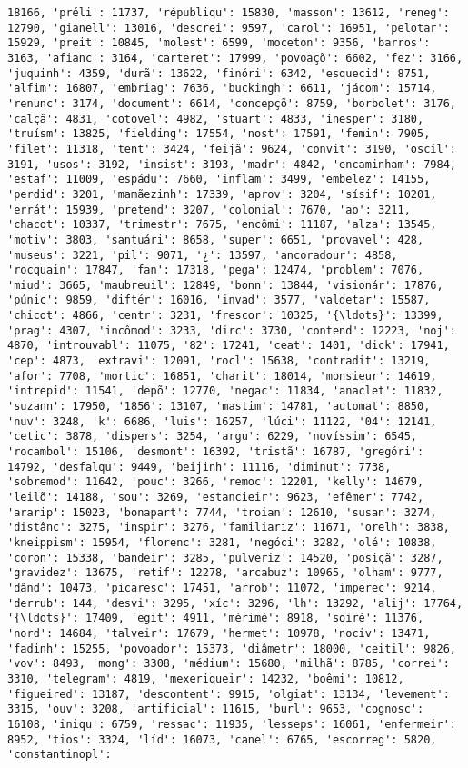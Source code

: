 \begin{Verbatim}[commandchars=\\\{\}]
18166, 'préli': 11737, 'républiqu': 15830, 'masson': 13612, 'reneg': 12790, 'gianell': 13016, 'descrei': 9597, 'carol': 16951, 'pelotar': 15929, 'preit': 10845, 'molest': 6599, 'moceton': 9356, 'barros': 3163, 'afianc': 3164, 'carteret': 17999, 'povoaçõ': 6602, 'fez': 3166, 'juquinh': 4359, 'durã': 13622, 'finóri': 6342, 'esquecid': 8751, 'alfim': 16807, 'embriag': 7636, 'buckingh': 6611, 'jácom': 15714, 'renunc': 3174, 'document': 6614, 'concepçõ': 8759, 'borbolet': 3176, 'calçã': 4831, 'cotovel': 4982, 'stuart': 4833, 'inesper': 3180, 'truísm': 13825, 'fielding': 17554, 'nost': 17591, 'femin': 7905, 'filet': 11318, 'tent': 3424, 'feijã': 9624, 'convit': 3190, 'oscil': 3191, 'usos': 3192, 'insist': 3193, 'madr': 4842, 'encaminham': 7984, 'estaf': 11009, 'espádu': 7660, 'inflam': 3499, 'embelez': 14155, 'perdid': 3201, 'mamãezinh': 17339, 'aprov': 3204, 'sísif': 10201, 'errát': 15939, 'pretend': 3207, 'colonial': 7670, 'ao': 3211, 'chacot': 10337, 'trimestr': 7675, 'encômi': 11187, 'alza': 13545, 'motiv': 3803, 'santuári': 8658, 'super': 6651, 'provavel': 428, 'museus': 3221, 'pil': 9071, '¿': 13597, 'ancoradour': 4858, 'rocquain': 17847, 'fan': 17318, 'pega': 12474, 'problem': 7076, 'miud': 3665, 'maubreuil': 12849, 'bonn': 13844, 'visionár': 17876, 'púnic': 9859, 'diftér': 16016, 'invad': 3577, 'valdetar': 15587, 'chicot': 4866, 'centr': 3231, 'frescor': 10325, '{\ldots}': 13399, 'prag': 4307, 'incômod': 3233, 'dirc': 3730, 'contend': 12223, 'noj': 4870, 'introuvabl': 11075, '82': 17241, 'ceat': 1401, 'dick': 17941, 'cep': 4873, 'extravi': 12091, 'rocl': 15638, 'contradit': 13219, 'afor': 7708, 'mortic': 16851, 'charit': 18014, 'monsieur': 14619, 'intrepid': 11541, 'depõ': 12770, 'negac': 11834, 'anaclet': 11832, 'suzann': 17950, '1856': 13107, 'mastim': 14781, 'automat': 8850, 'nuv': 3248, 'k': 6686, 'luis': 16257, 'lúci': 11122, '04': 12141, 'cetic': 3878, 'dispers': 3254, 'argu': 6229, 'novíssim': 6545, 'rocambol': 15106, 'desmont': 16392, 'tristã': 16787, 'gregóri': 14792, 'desfalqu': 9449, 'beijinh': 11116, 'diminut': 7738, 'sobremod': 11642, 'pouc': 3266, 'remoc': 12201, 'kelly': 14679, 'leilõ': 14188, 'sou': 3269, 'estancieir': 9623, 'efêmer': 7742, 'ararip': 15023, 'bonapart': 7744, 'troian': 12610, 'susan': 3274, 'distânc': 3275, 'inspir': 3276, 'familiariz': 11671, 'orelh': 3838, 'kneippism': 15954, 'florenc': 3281, 'negóci': 3282, 'olé': 10838, 'coron': 15338, 'bandeir': 3285, 'pulveriz': 14520, 'posiçã': 3287, 'gravidez': 13675, 'retif': 12278, 'arcabuz': 10965, 'olham': 9777, 'dând': 10473, 'picaresc': 17451, 'arrob': 11072, 'imperec': 9214, 'derrub': 144, 'desvi': 3295, 'xíc': 3296, 'lh': 13292, 'alij': 17764, '{\ldots}': 17409, 'egit': 4911, 'mérimé': 8918, 'soiré': 11376, 'nord': 14684, 'talveir': 17679, 'hermet': 10978, 'nociv': 13471, 'fadinh': 15255, 'povoador': 15373, 'diâmetr': 18000, 'ceitil': 9826, 'vov': 8493, 'mong': 3308, 'médium': 15680, 'milhã': 8785, 'correi': 3310, 'telegram': 4819, 'mexeriqueir': 14232, 'boêmi': 10812, 'figueired': 13187, 'descontent': 9915, 'olgiat': 13134, 'levement': 3315, 'ouv': 3208, 'artificial': 11615, 'burl': 9653, 'cognosc': 16108, 'iniqu': 6759, 'ressac': 11935, 'lesseps': 16061, 'enfermeir': 8952, 'tios': 3324, 'líd': 16073, 'canel': 6765, 'escorreg': 5820, 'constantinopl': 
\end{Verbatim}
